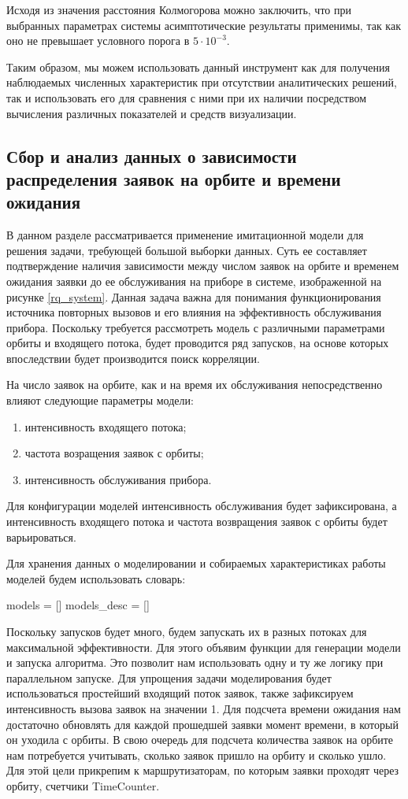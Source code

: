 Исходя из значения расстояния Колмогорова можно заключить, что при выбранных параметрах системы асимптотические результаты применимы, так как оно не превышает условного порога в $5\cdot 10^{-3}$.

Таким образом, мы можем использовать данный инструмент как для получения наблюдаемых численных характеристик при отсутствии аналитических решений, так и использовать его для сравнения с ними при их наличии посредством вычисления различных показателей и средств визуализации.

\subsection{Сбор и анализ данных о зависимости распределения заявок на орбите и времени ожидания}
В данном разделе рассматривается применение имитационной модели для решения задачи, требующей большой выборки данных. Суть ее составляет подтверждение наличия зависимости между числом заявок на орбите и временем ожидания заявки до ее обслуживания на приборе в системе, изображенной на рисунке \ref{rq_system}. Данная задача важна для понимания функционирования источника повторных вызовов и его влияния на эффективность обслуживания прибора. Поскольку требуется рассмотреть модель с различными параметрами орбиты и входящего потока, будет проводится ряд запусков, на основе которых впоследствии будет производится поиск корреляции.

На число заявок на орбите, как и на время их обслуживания непосредственно влияют следующие параметры модели:
\begin{enumerate}
	\item интенсивность входящего потока;
	\item частота возращения заявок с орбиты;
	\item интенсивность обслуживания прибора.
\end{enumerate} 

Для конфигурации моделей интенсивность обслуживания будет зафиксирована, а интенсивность входящего потока и частота возвращения заявок с орбиты будет варьироваться.

Для хранения данных о моделировании и собираемых характеристиках работы моделей будем использовать словарь:
\begin{pyin} 
models = []
models_desc = []
\end{pyin}

Поскольку запусков будет много, будем запускать их в разных потоках для максимальной эффективности. Для этого объявим функции для генерации модели и запуска алгоритма. Это позволит нам использовать одну и ту же логику при параллельном запуске. Для упрощения задачи моделирования будет использоваться простейший входящий поток заявок, также зафиксируем интенсивность вызова заявок на значении 1. Для подсчета времени ожидания нам достаточно обновлять для каждой прошедшей заявки момент времени, в который он уходила с орбиты. В свою очередь для подсчета количества заявок на орбите нам потребуется учитывать, сколько заявок пришло на орбиту и сколько ушло. Для этой цели прикрепим к маршрутизаторам, по которым заявки проходят через орбиту, счетчики TimeCounter.

